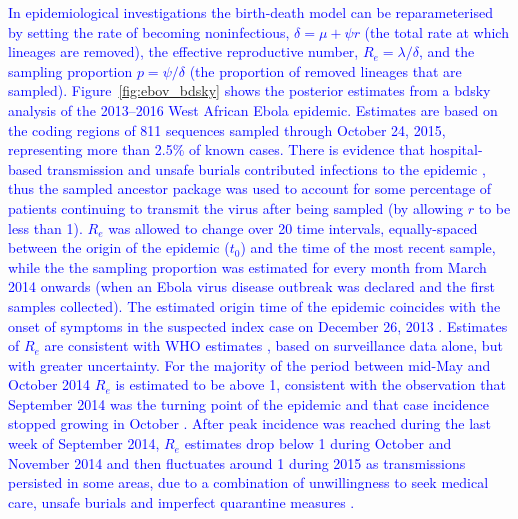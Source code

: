 
\noindent
\textcolor{blue}{
In epidemiological investigations the birth-death model can be reparameterised by setting the rate of becoming noninfectious, $\delta = \mu + \psi r$ (the total rate at which lineages are removed), the effective reproductive number, $R_e = \lambda / \delta$, and the sampling proportion $p = \psi / \delta$ (the proportion of removed lineages that are sampled). 
Figure~\ref{fig:ebov_bdsky} shows the posterior estimates from a bdsky analysis of the 2013--2016 West African Ebola epidemic. Estimates are based on the coding regions of 811 sequences sampled through October 24, 2015, representing more than 2.5\% of known cases. 
There is evidence that hospital-based transmission and unsafe burials contributed infections to the epidemic \citep{Whitty2014Nature}, thus the sampled ancestor package was used to account for some percentage of patients continuing to transmit the virus after being sampled (by allowing $r$ to be less than 1). 
$R_e$ was allowed to change over 20 time intervals, equally-spaced between the origin of the epidemic ($t_0$) and the time of the most recent sample, while the the sampling proportion was estimated for every month from March 2014 onwards (when an Ebola virus disease outbreak was declared and the first samples collected). 
The estimated origin time of the epidemic coincides with the onset of symptoms in the suspected index case on December 26, 2013 \citep{WHO2016NEJM}.
Estimates of $R_e$ are consistent with WHO estimates \citep{WHO2015NEJM}, based on surveillance data alone, but with greater uncertainty. 
For the majority of the period between mid-May and October 2014 $R_e$ is estimated to be above 1, consistent with the observation that September 2014 was the turning point of the epidemic and that case incidence stopped growing in October \citep{WHO2015NEJM}. 
After peak incidence was reached during the last week of September 2014, $R_e$ estimates drop below 1 during October and November 2014 and then fluctuates around 1 during 2015 as transmissions persisted in some areas, due to a combination of unwillingness to seek medical care, unsafe burials and imperfect quarantine measures \citep{WHO2016NEJM}. %
}
